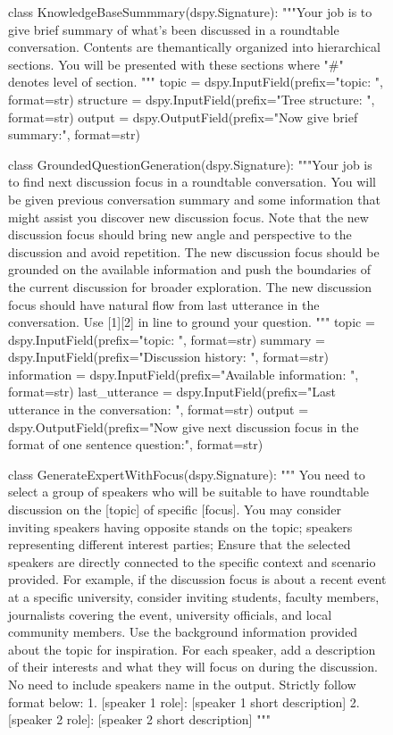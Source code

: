 \documentclass[11pt]{article}
\begin{document}
\begin{figure}

\begin{prompt}
class KnowledgeBaseSummmary(dspy.Signature):
    """Your job is to give brief summary of what's been discussed in a roundtable conversation. Contents are themantically organized into hierarchical sections.
    You will be presented with these sections where "#" denotes level of section.
    """
    topic = dspy.InputField(prefix="topic: ", format=str)
    structure = dspy.InputField(prefix="Tree structure: \n", format=str)
    output = dspy.OutputField(prefix="Now give brief summary:\n", format=str)

class GroundedQuestionGeneration(dspy.Signature):
    """Your job is to find next discussion focus in a roundtable conversation. You will be given previous conversation summary and some information that might assist you discover new discussion focus.
       Note that the new discussion focus should bring new angle and perspective to the discussion and avoid repetition. The new discussion focus should be grounded on the available information and push the boundaries of the current discussion for broader exploration.
       The new discussion focus should have natural flow from last utterance in the conversation.
       Use [1][2] in line to ground your question. 
    """
    topic = dspy.InputField(prefix="topic: ", format=str)
    summary = dspy.InputField(prefix="Discussion history: \n", format=str)
    information = dspy.InputField(prefix="Available information: \n", format=str)
    last_utterance = dspy.InputField(prefix="Last utterance in the conversation: \n", format=str)
    output = dspy.OutputField(prefix="Now give next discussion focus in the format of one sentence question:\n", format=str)

class GenerateExpertWithFocus(dspy.Signature):
    """
    You need to select a group of speakers who will be suitable to have roundtable discussion on the [topic] of specific [focus].
    You may consider inviting speakers having opposite stands on the topic; speakers representing different interest parties; Ensure that the selected speakers are directly connected to the specific context and scenario provided.
    For example, if the discussion focus is about a recent event at a specific university, consider inviting students, faculty members, journalists covering the event, university officials, and local community members.
    Use the background information provided about the topic for inspiration. For each speaker, add a description of their interests and what they will focus on during the discussion.
    No need to include speakers name in the output.
    Strictly follow format below:
    1. [speaker 1 role]: [speaker 1 short description]
    2. [speaker 2 role]: [speaker 2 short description]
    """


\end{prompt}
\end{figure}
\end{document}
